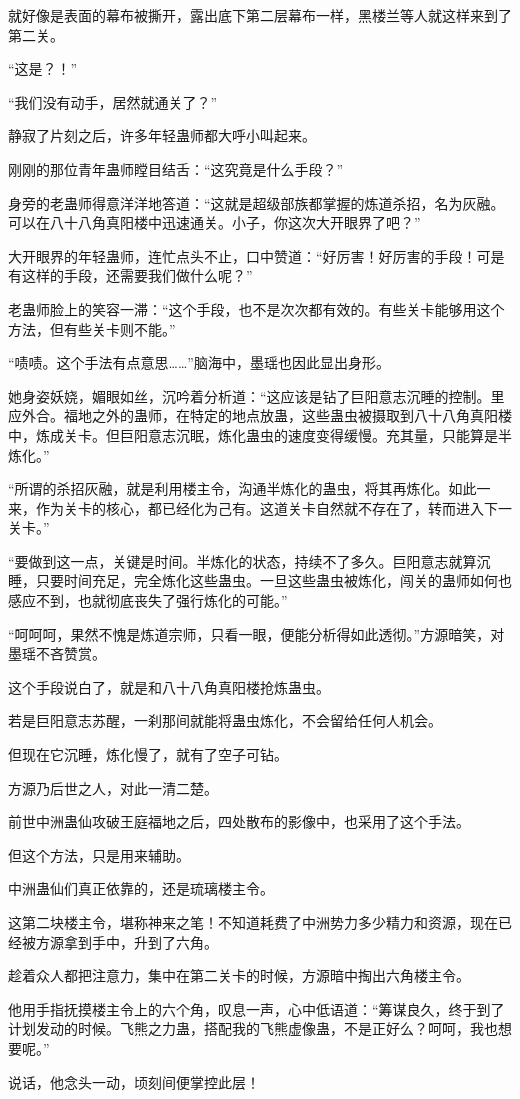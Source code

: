 \begin{this_body}
就好像是表面的幕布被撕开，露出底下第二层幕布一样，黑楼兰等人就这样来到了第二关。

“这是？！”

“我们没有动手，居然就通关了？”

静寂了片刻之后，许多年轻蛊师都大呼小叫起来。

刚刚的那位青年蛊师瞠目结舌：“这究竟是什么手段？”

身旁的老蛊师得意洋洋地答道：“这就是超级部族都掌握的炼道杀招，名为灰融。可以在八十八角真阳楼中迅速通关。小子，你这次大开眼界了吧？”

大开眼界的年轻蛊师，连忙点头不止，口中赞道：“好厉害！好厉害的手段！可是有这样的手段，还需要我们做什么呢？”

老蛊师脸上的笑容一滞：“这个手段，也不是次次都有效的。有些关卡能够用这个方法，但有些关卡则不能。”

“啧啧。这个手法有点意思……”脑海中，墨瑶也因此显出身形。

她身姿妖娆，媚眼如丝，沉吟着分析道：“这应该是钻了巨阳意志沉睡的控制。里应外合。福地之外的蛊师，在特定的地点放蛊，这些蛊虫被摄取到八十八角真阳楼中，炼成关卡。但巨阳意志沉眠，炼化蛊虫的速度变得缓慢。充其量，只能算是半炼化。”

“所谓的杀招灰融，就是利用楼主令，沟通半炼化的蛊虫，将其再炼化。如此一来，作为关卡的核心，都已经化为己有。这道关卡自然就不存在了，转而进入下一关卡。”

“要做到这一点，关键是时间。半炼化的状态，持续不了多久。巨阳意志就算沉睡，只要时间充足，完全炼化这些蛊虫。一旦这些蛊虫被炼化，闯关的蛊师如何也感应不到，也就彻底丧失了强行炼化的可能。”

“呵呵呵，果然不愧是炼道宗师，只看一眼，便能分析得如此透彻。”方源暗笑，对墨瑶不吝赞赏。

这个手段说白了，就是和八十八角真阳楼抢炼蛊虫。

若是巨阳意志苏醒，一刹那间就能将蛊虫炼化，不会留给任何人机会。

但现在它沉睡，炼化慢了，就有了空子可钻。

方源乃后世之人，对此一清二楚。

前世中洲蛊仙攻破王庭福地之后，四处散布的影像中，也采用了这个手法。

但这个方法，只是用来辅助。

中洲蛊仙们真正依靠的，还是琉璃楼主令。

这第二块楼主令，堪称神来之笔！不知道耗费了中洲势力多少精力和资源，现在已经被方源拿到手中，升到了六角。

趁着众人都把注意力，集中在第二关卡的时候，方源暗中掏出六角楼主令。

他用手指抚摸楼主令上的六个角，叹息一声，心中低语道：“筹谋良久，终于到了计划发动的时候。飞熊之力蛊，搭配我的飞熊虚像蛊，不是正好么？呵呵，我也想要呢。”

说话，他念头一动，顷刻间便掌控此层！

\end{this_body}

